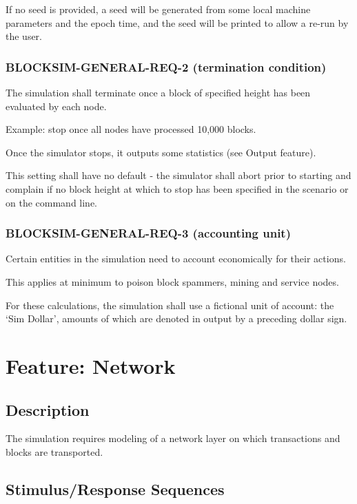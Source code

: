 \documentclass{scrreprt}
\begin{document}
        If no seed is provided, a seed will be generated from some local
        machine parameters and the epoch time, and the seed will be printed
        to allow a re-run by the user.

      \subsubsection{BLOCKSIM-GENERAL-REQ-2 (termination condition)}

        The simulation shall terminate once a block of specified height has
        been evaluated by each node.

        Example: stop once all nodes have processed 10,000 blocks.

        Once the simulator stops, it outputs some statistics (see Output
        feature).

        This setting shall have no default - the simulator shall abort prior
        to starting and complain if no block height at which to stop has been
        specified in the scenario or on the command line.

      \subsubsection{BLOCKSIM-GENERAL-REQ-3 (accounting unit)}

        Certain entities in the simulation need to account economically for
        their actions.

        This applies at minimum to poison block spammers, mining and service
        nodes.

        For these calculations, the simulation shall use a fictional unit of
        account: the `Sim Dollar', amounts of which are denoted in output
        by a preceding dollar sign.

  \section{Feature: Network}

    \subsection{Description}

      The simulation requires modeling of a network layer on which
      transactions and blocks are transported.

    \subsection{Stimulus/Response Sequences}
\end{document}
